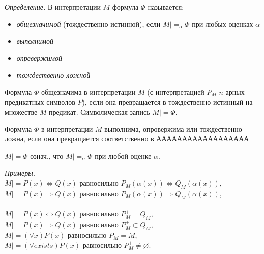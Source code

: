 \documentclass{SCWorks}
\begin{document}
\par {\it Определение.} В интерпретации $M$ формула $\Phi$ называется:
\begin{itemize}
    \item {\it общезначимой} (тождественно истинной), если $M |=_\alpha \Phi$ при любых оценках $\alpha$
    \item {\it выполнимой}
    \item {\it опревержимой}
    \item {\it тождественно ложной}
\end{itemize}

\par Формула $\Phi$ общезначима в интерпретации $M$ (с интерпретацией $P_M$ $n$-арных предикатных символов $P$), если она превращается в тождественно истинный на множестве $M$ предикат. Символическая запись $M |= \Phi$.
\par Формула $\Phi$ в интерпретации $M$ выполнима, опровержима или тождественно ложна, если она превращается соответственно в АААААААААААААААААА
\par $M |= \Phi$ означ., что $M |=_\alpha \Phi$ при любой оценке $\alpha$.
\par {\it Примеры.} \\
$M |= P(x) \Leftrightarrow Q(x)$ равносильно $P_M(\alpha(x)) \Leftrightarrow Q_M(\alpha(x))$, \\
$M |= P(x) \Rightarrow Q(x)$ равносильно $P_M(\alpha(x)) \Rightarrow Q_M(\alpha(x))$, \\ \\
$M |= P(x) \Leftrightarrow Q(x)$ равносильно $P_M^+ = Q_M^+$, \\
$M |= P(x) \Rightarrow Q(x)$ равносильно $P_M^+ \subset Q_M^+$, \\
$M |= (\forall x)P(x)$ равносильно $P_M^+ = M$, \\
$M |= (\forall exists)P(x)$ равносильно $P_M^+ \neq \varnothing$.
\end{document}
